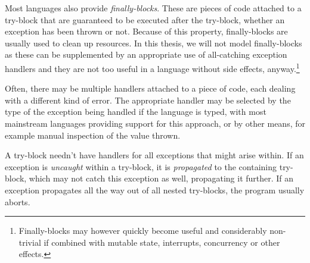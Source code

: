 Most languages also provide \emph{finally-blocks}. These are pieces of code attached to a
try-block that are guaranteed to be executed after the try-block, whether an exception
has been thrown or not. Because of this property, finally-blocks are usually used to clean up
resources. In this thesis, we will not model finally-blocks as these can be
supplemented by an appropriate use of all-catching exception handlers and they are not
too useful in a language without side effects, anyway.\footnote{Finally-blocks
may however quickly become useful and considerably non-trivial if combined with mutable state,
interrupts, concurrency or other effects.}

Often, there may be multiple handlers attached to a piece of code, each dealing with a different
kind of error. The appropriate handler
may be selected by the type of the exception being handled if the language is typed, with
most mainstream languages providing support for this approach, or by other means, for example
manual inspection of the value thrown.

A try-block needn't have handlers for all exceptions that might arise within. If an exception
is \emph{uncaught} within a try-block, it is \emph{propagated} to the containing try-block,
which may not catch this exception as well, propagating it further.
If an exception propagates all the way out of all nested try-blocks, the program usually
aborts.

